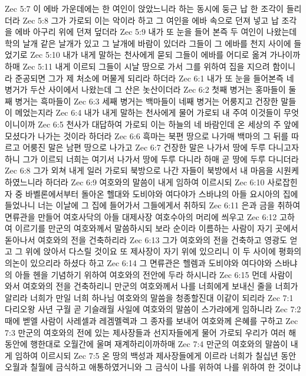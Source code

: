 Zec 5:7  이 에바 가운데에는 한 여인이 앉았느니라 하는 동시에 둥근 납 한 조각이 들리더라
Zec 5:8  그가 가로되 이는 악이라 하고 그 여인을 에바 속으로 던져 넣고 납 조각을 에바 아구리 위에 던져 덮더라
Zec 5:9  내가 또 눈을 들어 본즉 두 여인이 나왔는데 학의 날개 같은 날개가 있고 그 날개에 바람이 있더라 그들이 그 에바를 천지 사이에 들었기로
Zec 5:10  내가 내게 말하는 천사에게 묻되 그들이 에바를 어디로 옮겨 가나이까 하매
Zec 5:11  내게 이르되 그들이 시날 땅으로 가서 그를 위하여 집을 지으려 함이니라 준공되면 그가 제 처소에 머물게 되리라 하더라
Zec 6:1  내가 또 눈을 들어본즉 네 병거가 두산 사이에서 나왔는데 그 산은 놋산이더라
Zec 6:2  첫째 병거는 홍마들이 둘째 병거는 흑마들이
Zec 6:3  세째 병거는 백마들이 네째 병거는 어룽지고 건장한 말들이 메었는지라
Zec 6:4  내가 내게 말하는 천사에게 물어 가로되 내 주여 이것들이 무엇이니이까
Zec 6:5  천사가 대답하여 가로되 이는 하늘의 네 바람인데 온 세상의 주 앞에 모셨다가 나가는 것이라 하더라
Zec 6:6  흑마는 북편 땅으로 나가매 백마의 그 뒤를 따르고 어룽진 말은 남편 땅으로 나가고
Zec 6:7  건장한 말은 나가서 땅에 두루 다니고자 하니 그가 이르되 너희는 여기서 나가서 땅에 두루 다니라 하매 곧 땅에 두루 다니더라
Zec 6:8  그가 외쳐 내게 일러 가로되 북방으로 나간 자들이 북방에서 내 마음을 시원케 하였느니라 하더라
Zec 6:9  여호와의 말씀이 내게 임하여 이르시되
Zec 6:10  사로잡힌 자 중 바벨론에서부터 돌아온 헬대와 도비야와 여다야가 스바냐의 아들 요시아의 집에 들었나니 너는 이날에 그 집에 들어가서 그들에게서 취하되
Zec 6:11  은과 금을 취하여 면류관을 만들어 여호사닥의 아들 대제사장 여호수아의 머리에 씌우고
Zec 6:12  고하여 이르기를 만군의 여호와께서 말씀하시되 보라 순이라 이름하는 사람이 자기 곳에서 돋아나서 여호와의 전을 건축하리라
Zec 6:13  그가 여호와의 전을 건축하고 영광도 얻고 그 위에 앉아서 다스릴 것이요 또 제사장이 자기 위에 있으리니 이 두 사이에 평화의 의논이 있으리라 하셨다 하고
Zec 6:14  그 면류관은 헬렘과 도비야와 여다야와 스바냐의 아들 헨을 기념하기 위하여 여호와의 전안에 두라 하시니라
Zec 6:15  먼데 사람이 와서 여호와의 전을 건축하리니 만군의 여호와께서 나를 너희에게 보내신 줄을 너희가 알리라 너희가 만일 너희 하나님 여호와의 말씀을 청종할진대 이같이 되리라
Zec 7:1  다리오왕 사년 구월 곧 기슬래월 사일에 여호와의 말씀이 스가랴에게 임하니라
Zec 7:2  때에 벧엘 사람이 사레셀과 레겜멜렉과 그 종자를 보내어 여호와께 은혜를 구하고
Zec 7:3  만군의 여호와의 전에 있는 제사장들과 선지자들에게 물어 가로되 우리가 여러 해 동안에 행한대로 오월간에 울며 재계하리이까하매
Zec 7:4  만군의 여호와의 말씀이 내게 임하여 이르시되
Zec 7:5  온 땅의 백성과 제사장들에게 이르라 너희가 칠십년 동안 오월과 칠월에 금식하고 애통하였거니와 그 금식이 나를 위하여 나를 위하여 한 것이냐
